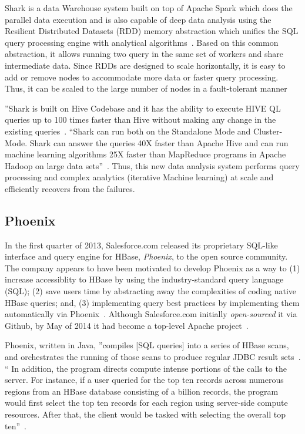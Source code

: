 Shark is a data Warehouse system built on top of Apache Spark which
does the parallel data execution and is also capable of deep data
analysis using the Resilient Distributed Datasets (RDD) memory
abstraction which unifies the SQL query processing engine with
analytical algorithms~\cite{shark-paper-2012}. Based on this common
abstraction, it allows running two query in the same set of workers
and share intermediate data. Since RDDs are designed to scale
horizontally, it is easy to add or remove nodes to accommodate more
data or faster query processing. Thus, it can be scaled to the large
number of nodes in a fault-tolerant manner

''Shark is built on Hive Codebase and it has the ability to execute
HIVE QL queries up to 100 times faster than Hive without making any
change in the existing queries~\cite{shark-paper-2012}. ``Shark can
run both on the Standalone Mode and Cluster-Mode. Shark can answer the
queries 40X faster than Apache Hive and can run machine learning
algorithms 25X faster than MapReduce programs in Apache Hadoop on
large data sets''~\cite{shark-paper-2012}. Thus, this new data
analysis system performs query processing and complex analytics
(iterative Machine learning) at scale and efficiently recovers from
the failures.

\subsection{Phoenix}

In the first quarter of 2013, Salesforce.com released its proprietary
SQL-like interface and query engine for HBase, \textit{Phoenix}, to the open
source community.  The company appears to have been motivated to
develop Phoenix as a way to (1) increase accessiblity to HBase by using
the industry-standard query language (SQL); (2) save users time by
abstracting away the complexities of coding native HBase queries; and,
(3) implementing query best practices by implementing them
automatically via Phoenix~\cite{www-phoenix-cloudera}. Although
Salesforce.com initially \textit{open-sourced} it via Github, by May of 2014
it had become a top-level Apache project~\cite{www-phoenix-wikipedia}.

Phoenix, written in Java, ''compiles [SQL queries] into a series of
HBase scans, and orchestrates the running of those scans to produce
regular JDBC result sets~\cite{www-apachephoenix-org}. `` In addition,
the program directs compute intense portions of the calls to the
server.  For instance, if a user queried for the top ten records
across numerous regions from an HBase database consisting of a billion
records, the program would first select the top ten records for each
region using server-side compute resources.  After that, the client
would be tasked with selecting the overall top
ten''~\cite{www-phoenix-salesforcedev}.

